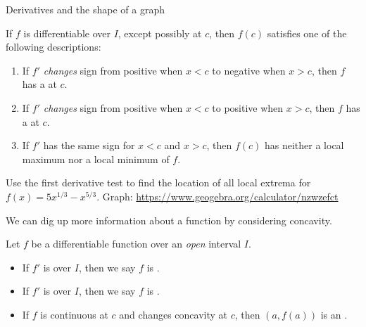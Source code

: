 \documentclass[../main.tex]{subfiles}
\begin{document}
\begin{lesson}{Derivatives and the shape of a graph}
\begin{mdframed}[style=withref-compact]
    If \(f\) is differentiable over \(I\), except possibly at \(c\), then \(f(c)\) satisfies one of the following descriptions:
    \begin{enumerate}
      \item  If \(f'\) \emph{changes} sign from positive when \(x < c\) to negative when \(x > c\), then \(f\) has a \underline{\hspace{2in}} at \(c\).
      \item  If \(f'\) \emph{changes} sign from positive when \(x < c\) to positive when \(x > c\), then \(f\) has a \underline{\hspace{2in}} at \(c\).
      \item  If \(f'\) has the same sign for \(x < c\) and \(x > c\), then \(f(c)\) has neither a local maximum nor a local minimum of \(f\).
    \end{enumerate}

  \end{mdframed}

  \begin{example} \label{ex:first-derivative}
    Use the first derivative test to find the location of all local extrema for \(f(x) = 5x^{1/3} - x^{5/3}\). Graph: \url{https://www.geogebra.org/calculator/nzwzefct}

  \end{example}
  \clearpage

  We can dig up more information about a function by considering concavity.
  \begin{mdframed}[style=withref-compact]
    Let \(f\) be a differentiable function over an \emph{open} interval \(I\).
    \begin{itemize}
      \item If \(f'\) is \underline{\hspace{1in}} over \(I\), then we say \(f\) is .
      \item If \(f'\) is \underline{\hspace{1in}} over \(I\), then we say \(f\) is .
      \item If \(f\) is continuous at \(c\) and changes concavity at \(c\), then \((a,f(a))\) is an . 
    \end{itemize}

  \end{mdframed}


\end{lesson}
\end{document}
